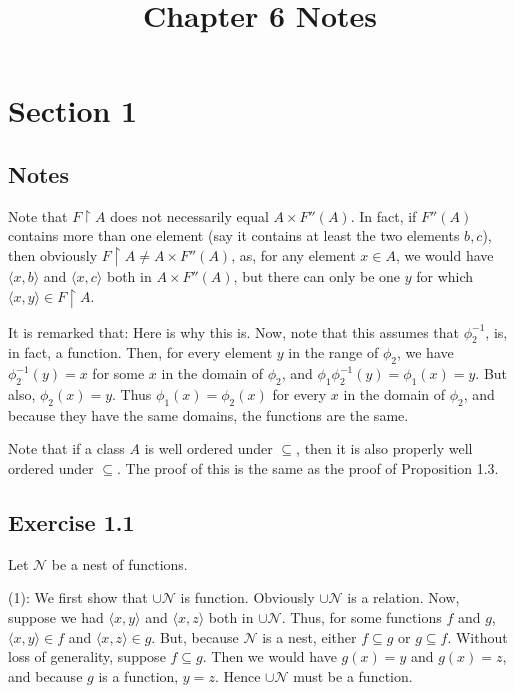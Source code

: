 \documentclass{article}
\title{Chapter 6 Notes}
\theoremstyle{definition}
\begin{document}
\date{}
\maketitle

\section*{Section 1}

\subsection*{Notes}
Note that $F\restriction A$ does not necessarily equal $A\times F''(A)$. In fact, if 
$F''(A)$ contains more than one element (say it contains at least the two elements $b,c$), then obviously $F\restriction A\ne A\times F''(A)$, as, 
for any element $x\in A$, we would have $\langle x,b\rangle$ and $\langle x,c\rangle$ both in $A\times F''(A)$, 
but there can only be one $y$ for which $\langle x,y\rangle\in F\restriction A$.

It is remarked that: Here is why this is. Now, note that this assumes that $\phi_2^{-1}$, is, in fact, a function. Then, for 
every element $y$ in the range of $\phi_2$, we have $\phi_2^{-1}(y)=x$ for some $x$ in the domain of $\phi_2$, and 
$\phi_1\phi_2^{-1}(y)=\phi_1(x)=y$. But also, $\phi_2(x)=y$. Thus $\phi_1(x)=\phi_2(x)$ for every $x$ in the domain of $\phi_2$, and 
because they have the same domains, the functions are the same.

Note that if a class $A$ is well ordered under $\subseteq$, then it is also properly well ordered under $\subseteq$. The proof of this is the same as 
the proof of Proposition 1.3.

\subsection*{Exercise 1.1}
Let $\mathcal{N}$ be a nest of functions.

(1): We first show that $\cup\mathcal{N}$ is function. Obviously $\cup\mathcal{N}$ is a relation. Now, suppose we 
had $\langle x,y\rangle$ and $\langle x,z\rangle$ both in $\cup\mathcal{N}$. Thus, for some functions $f$ and $g$, 
$\langle x,y\rangle\in f$ and $\langle x,z\rangle\in g$. But, because $\mathcal{N}$ is a nest, either $f\subseteq g$ or $g\subseteq f$. Without 
loss of generality, suppose $f\subseteq g$. Then we would have $g(x)=y$ and $g(x)=z$, and because $g$ is a function, $y=z$. Hence $\cup\mathcal{N}$
must be a function.
\end{document}
